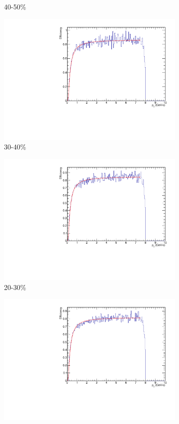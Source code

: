 \begin{figure}[htbp]
\begin{subfigure}{0.5\textwidth}
		\caption{40-50\%}
		\label{fig:assoheffb}
	\end{subfigure}	
	\begin{subfigure}{0.5\textwidth}
		\includegraphics[width=.9\textwidth]{Plots/Correlations/hadron_efficiency/hadron_efficiency_centbin_4.pdf}
		\caption{30-40\%}
		\label{fig:assoheffc}
	\end{subfigure}	
	\begin{subfigure}{0.5\textwidth}
		\includegraphics[width=.9\textwidth]{Plots/Correlations/hadron_efficiency/hadron_efficiency_centbin_5.pdf}
		\caption{20-30\%}
		\label{fig:assoheffd}
	\end{subfigure}	
	\begin{subfigure}{0.5\textwidth}
		\includegraphics[width=.9\textwidth]{Plots/Correlations/hadron_efficiency/hadron_efficiency_centbin_6.pdf}

\end{subfigure}
\end{figure}
